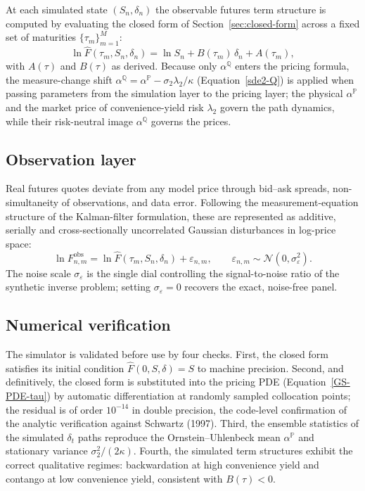 At each simulated state $(S_n, \delta_n)$ the observable futures term
structure is computed by evaluating the closed form of
Section~\ref{sec:closed-form} across a fixed set of maturities
$\{\tau_m\}_{m=1}^{M}$:
\begin{equation}
    \ln \hat{F}(\tau_m, S_n, \delta_n)
      = \ln S_n + B(\tau_m)\,\delta_n + A(\tau_m),
\end{equation}
with $A(\tau)$ and $B(\tau)$ as derived. Because only $\alpha^{\mathbb{Q}}$
enters the pricing formula, the measure-change shift
$\alpha^{\mathbb{Q}} = \alpha^{\mathbb{P}} - \sigma_2\lambda_2/\kappa$
(Equation~\ref{sde2-Q}) is applied when passing parameters from the
simulation layer to the pricing layer; the physical $\alpha^{\mathbb{P}}$
and the market price of convenience-yield risk $\lambda_2$ govern the path
dynamics, while their risk-neutral image $\alpha^{\mathbb{Q}}$ governs the
prices.

\subsection{Observation layer}
\label{sec:obs-layer}

Real futures quotes deviate from any model price through bid--ask spreads,
non-simultaneity of observations, and data error. Following the
measurement-equation structure of the Kalman-filter formulation, these are
represented as additive, serially and cross-sectionally uncorrelated
Gaussian disturbances in log-price space:
\begin{equation}
    \ln F^{\mathrm{obs}}_{n,m}
      = \ln \hat{F}(\tau_m, S_n, \delta_n) + \varepsilon_{n,m},
    \qquad \varepsilon_{n,m} \sim \mathcal{N}(0, \sigma_\varepsilon^2).
\end{equation}
The noise scale $\sigma_\varepsilon$ is the single dial controlling the
signal-to-noise ratio of the synthetic inverse problem; setting
$\sigma_\varepsilon = 0$ recovers the exact, noise-free panel.

\subsection{Numerical verification}
\label{sec:sim-verification}

The simulator is validated before use by four checks. First, the closed
form satisfies its initial condition $\hat{F}(0, S, \delta) = S$ to
machine precision. Second, and definitively, the closed form is
substituted into the pricing PDE (Equation~\ref{GS-PDE-tau}) by automatic
differentiation at randomly sampled collocation points; the residual is of
order $10^{-14}$ in double precision, the code-level confirmation of the
analytic verification against Schwartz (1997). Third, the ensemble
statistics of the simulated $\delta_t$ paths reproduce the
Ornstein--Uhlenbeck mean $\alpha^{\mathbb{P}}$ and stationary variance
$\sigma_2^2/(2\kappa)$. Fourth, the simulated term structures exhibit the
correct qualitative regimes: backwardation at high convenience yield and
contango at low convenience yield, consistent with $B(\tau) < 0$.

